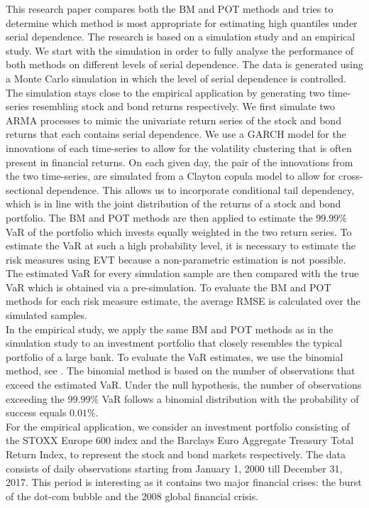 \documentclass[a4paper,12pt]{article}
\theoremstyle{plain}
\begin{document}
This research paper compares both the BM and POT methods and tries to determine which method is most appropriate for estimating high quantiles under serial dependence. The research is based on a simulation study and an empirical study. We start with the simulation in order to fully analyse the performance of both methods on different levels of serial dependence. The data is generated using a Monte Carlo simulation in which the level of serial dependence is controlled. The simulation stays close to the empirical application by generating two time-series resembling stock and bond returns respectively. We first simulate two ARMA processes to mimic the univariate return series of the stock and bond returns that each contains serial dependence. We use a GARCH model for the innovations of each time-series to allow for the volatility clustering that is often present in financial returns. On each given day, the pair of the innovations from the two time-series, are simulated from a Clayton copula model to allow for cross-sectional dependence. This allows us to incorporate conditional tail dependency, which is in line with the joint distribution of the returns of a stock and bond portfolio. The BM and POT methods are then applied to estimate the $99.99\%$ VaR of the portfolio which invests equally weighted in the two return series. To estimate the VaR at such a high probability level, it is necessary to estimate the risk measures using EVT because a non-parametric estimation is not possible. The estimated VaR for every simulation sample are then compared with the true VaR which is obtained via a pre-simulation. To evaluate the BM and POT methods for each risk measure estimate, the average RMSE is calculated over the simulated samples. \\


In the empirical study, we apply the same BM and POT methods as in the simulation study to an investment portfolio that closely resembles the typical portfolio of a large bank. To evaluate the VaR estimates, we use the binomial method, see . The binomial method is based on the number of observations that exceed the estimated VaR. Under the null hypothesis, the number of observations exceeding the $99.99\%$ VaR follows a binomial distribution with the probability of success equals $0.01\%$. \\

For the empirical application, we consider an investment portfolio consisting of the STOXX Europe 600 index and the Barclays Euro Aggregate Treasury Total Return Index, to represent the stock and bond markets respectively. The data consists of daily observations starting from January 1, 2000 till December 31, 2017. This period is interesting as it contains two major financial crises: the burst of the dot-com bubble and the 2008 global financial crisis.\\
\end{document}
